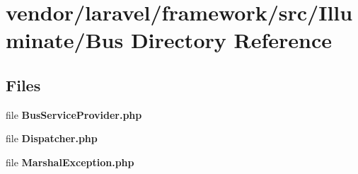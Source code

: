 \section{vendor/laravel/framework/src/\+Illuminate/\+Bus Directory Reference}
\label{dir_45e6ad17352a0f382adf62d722707320}
\subsection*{Files}
\begin{DoxyCompactItemize}
\item 
file {\bf Bus\+Service\+Provider.\+php}
\item 
file {\bf Dispatcher.\+php}
\item 
file {\bf Marshal\+Exception.\+php}
\end{DoxyCompactItemize}
